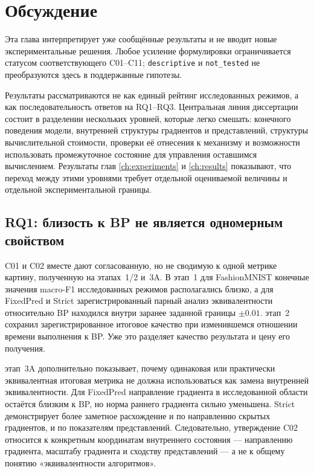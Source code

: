 \chapter{Обсуждение}
\label{ch:discussion}

Эта глава интерпретирует уже сообщённые результаты и не вводит новые
экспериментальные решения. Любое усиление формулировки ограничивается статусом
соответствующего C01--C11; \texttt{descriptive} и \texttt{not\_tested}
не преобразуются здесь в поддержанные гипотезы.

Результаты рассматриваются не как единый рейтинг исследованных режимов, а как
последовательность ответов на RQ1--RQ3. Центральная линия
диссертации состоит в разделении нескольких уровней, которые легко смешать:
конечного поведения модели, внутренней структуры градиентов и представлений,
структуры вычислительной стоимости, проверки её отнесения к механизму и возможности использовать промежуточное
состояние для управления оставшимся вычислением. Результаты глав
\ref{ch:experiments} и \ref{ch:results} показывают, что переход между этими
уровнями требует отдельной оцениваемой величины и отдельной экспериментальной
границы.

\section{RQ1: близость к BP не является одномерным свойством}
\label{sec:discussion-rq1}

C01 и C02 вместе дают согласованную, но не сводимую к одной метрике картину,
полученную на этапах~1/2 и~3A.
В этап~1 для FashionMNIST конечные значения macro-F1 исследованных режимов
располагались близко, а для FixedPred и Strict зарегистрированный парный анализ
эквивалентности относительно BP находился внутри заранее заданной границы
\(\pm 0.01\). этап~2 сохранил зарегистрированное итоговое качество при
изменившемся отношении времени выполнения к BP. Уже это разделяет качество
результата и цену его получения.

этап~3A дополнительно показывает, почему одинаковая или практически
эквивалентная итоговая метрика не должна использоваться как замена внутренней
эквивалентности. Для FixedPred направление градиента в исследованной области
остаётся близким к BP, но норма раннего градиента сильно уменьшена. Strict
демонстрирует более заметное расхождение и по направлению скрытых градиентов, и
по показателям представлений. Следовательно, утверждение C02 относится к
конкретным координатам внутреннего состояния --- направлению градиента,
масштабу градиента и сходству представлений --- а не к общему понятию
«эквивалентности алгоритмов».

